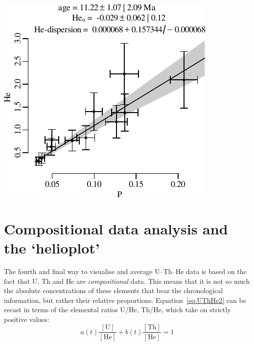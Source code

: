 \begin{refsection}
\noindent\begin{minipage}[t]{.4\linewidth}
\strut\vspace*{-\baselineskip}\newline
\includegraphics[width=\textwidth]{../figures/UThHeisochron.pdf}\\
\end{minipage}
\begin{minipage}[t]{.6\linewidth}
  \label{fig:UThHeisochron}
\end{minipage}

\section{Compositional data analysis and the `helioplot'}
\label{sec:UThHeCompositional}

The fourth and final way to visualise and average U--Th--He data is
based on the fact that U, Th and He are \emph{compositional}
data. This means that it is not so much the absolute concentrations of
these elements that bear the chronological information, but rather
their relative proportions. Equation~\ref{eq:UThHe2} can be recast in
terms of the elemental ratios U/He, Th/He, which take on strictly
positive values:
\begin{equation}
  a(t) \frac{[\mbox{U}]}{[\mbox{He}]} +
  b(t) \frac{[\mbox{Th}]}{[\mbox{He}]} = 1
\end{equation}


\end{refsection}
